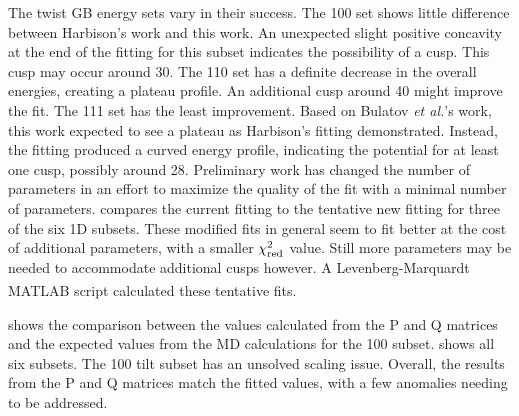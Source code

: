 \documentclass[twoside,senior]{BYUPhys}
\begin{document}
The twist GB energy sets vary in their success.  The \textlangle{}100\textrangle{} set shows little difference between Harbison's work and this work.  An unexpected slight positive concavity at the end of the fitting for this subset indicates the possibility of a cusp.  This cusp may occur around 30\textdegree{}.  The \textlangle{}110\textrangle{} set has a definite decrease in the overall energies, creating a plateau profile.  An additional cusp around 40\textdegree{} might improve the fit.  The \textlangle{}111\textrangle{} set has the least improvement.  Based on Bulatov \emph{et al.}'s work,\cite{bulatov2014} this work expected to see a plateau as Harbison's fitting demonstrated.\cite{harbison2015}  Instead, the fitting produced a curved energy profile, indicating the potential for at least one cusp, possibly around 28\textdegree{}.  Preliminary work has changed the number of parameters in an effort to maximize the quality of the fit with a minimal number of parameters.  compares the current fitting to the tentative new fitting for three of the six 1D subsets.  These modified fits in general seem to fit better at the cost of additional parameters, with a smaller $\chi_{\textnormal{red}}^2$ value.  Still more parameters may be needed to accommodate additional cusps however.  A Levenberg-Marquardt MATLAB\textsuperscript{\textregistered} script calculated these tentative fits.\cite{gavin2016}

 shows the comparison between the values calculated from the P and Q matrices and the expected values from the MD calculations for the \textlangle{}100\textrangle{} subset.   shows all six subsets.  The \textlangle{}100\textrangle{} tilt subset has an unsolved scaling issue.  Overall, the results from the P and Q matrices match the fitted values, with a few anomalies needing to be addressed.
\end{document}
